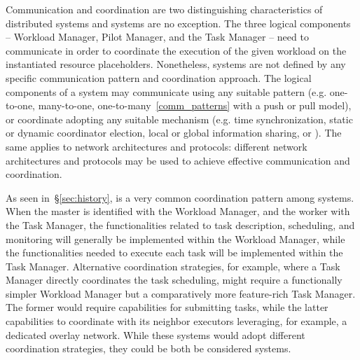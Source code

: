 \documentclass{sig-alternate}
\begin{document}
Communication and coordination are two distinguishing characteristics of
distributed systems and \pilotjob systems are no exception. The three logical
components -- Workload Manager, Pilot Manager, and the Task Manager -- need to
communicate in order to coordinate the execution of the given workload on the
instantiated resource placeholders.  Nonetheless, \pilotjob systems are not
defined by any specific communication pattern and coordination approach. The
logical components of a \pilotjob system may communicate using any suitable
pattern (e.g. one-to-one, many-to-one, one-to-many~\ref{comm_patterns} with a
push or pull model), or coordinate adopting any suitable mechanism (e.g. time
synchronization, static or dynamic coordinator election, local or global
information sharing, or \MW). The same applies to network architectures and
protocols: different network architectures and protocols may be used to achieve
effective communication and coordination.

As seen in~\S\ref{sec:history}, \MW is a very common coordination pattern among
\pilotjob systems. When the master is identified with the Workload Manager, and
the worker with the Task Manager, the functionalities related to task
description, scheduling, and monitoring will generally be implemented within the
Workload Manager, while the functionalities needed to execute each task will be
implemented within the Task Manager. Alternative coordination strategies, for
example, where a Task Manager directly coordinates the task scheduling, might
require a functionally simpler Workload Manager but a comparatively more
feature-rich Task Manager. The former would require capabilities for submitting
tasks, while the latter capabilities to coordinate with its neighbor executors
leveraging, for example, a dedicated overlay network. While these systems would adopt
different coordination strategies, they could be both be considered \pilotjob
systems.
\end{document}
